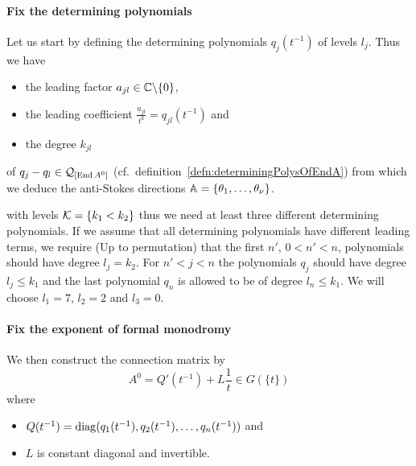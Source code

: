\paragraph{Fix the determining polynomials}
Let us start by defining the determining polynomials $q_j(t^{-1})$ of levels
$l_j$.
Thus we have
\begin{itemize}
  \item the leading factor $a_{jl}\in\mathbb{C}\backslash\{0\}$,
  \item the leading coefficient $\frac{a_{jl}}{t^{k}}=q_{jl}(t^{-1})$ and
  \item the degree $k_{jl}$
\end{itemize}
of $q_j-q_l\in\mathcal{Q}_{[\operatorname{End} A^0]}$
(cf.\ definition~\ref{defn:determiningPolysOfEndA})
from which we deduce the anti-Stokes directions
$\mathbb{A}=\{\theta_1,\dots,\theta_\nu\}$.

 with levels $\mathcal{K}=\{k_1<k_2\}$ thus we
need at least three different determining polynomials.
If we assume that all determining polynomials have different leading terms, we
require (Up to permutation) that the first $n'$, $0<n'<n$,
polynomials should have degree $l_j=k_2$.
For $n'<j<n$ the polynomials $q_j$ should have degree $l_j\leq k_1$ and the
last polynomial $q_n$ is allowed to be of degree $l_n\leq k_1$.
We will choose $l_1=7$, $l_2=2$ and $l_3=0$.
\begin{comment}
  Thus
  \begin{align*}
    q_1= \frac{a_1^7}{t^7}+ \sum_{j\in\{1,\dots,6\}}\frac{a_1^j}{t^j}
  &&\text{,}&&q_2= \frac{a_2^2}{t^2}+ \frac{a_2^1}{t^1}
  &&\text{and}&&q_3=0
  \end{align*}
  and the differences are given by
  \begin{align*}
    q_1-q_2= \frac{a_1^7}{t^7}+
      \cdots+
      \frac{a_1^3}{t^3}+ \frac{a_1^2-a_2^2}{t^2}+
      \frac{a_1^1-a_2^1}{t^1}
  &&\text{,}&&q_1-q_3=q_1
  &&\text{and}&&q_2-q_3=q_2
  \end{align*}
\end{comment}

\paragraph{Fix the exponent of formal monodromy}
We then construct the connection matrix by
  \[
    A^0=Q'(t^{-1})+L\frac{1}{t} \in G(\!\{t\}\!)
  \]
where
\begin{itemize}
  \item $Q(t^{-1})=\operatorname{diag}(q_1(t^{-1}),q_2(t^{-1}),\dots,q_n(t^{-1}))$
    and
  \item $L$ is constant diagonal and invertible.
\end{itemize}

